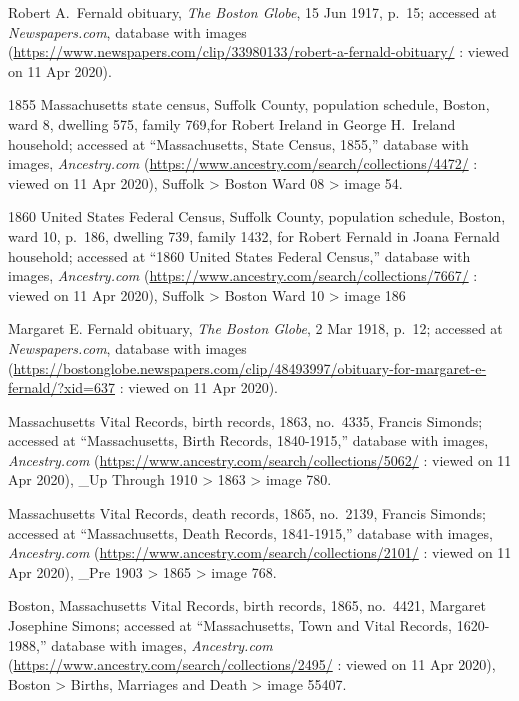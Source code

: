 \begin{thebibliography}{999}
	Robert A.\ Fernald obituary, \textit{The Boston Globe}, 15 Jun 1917, p.\ 15; accessed at \textit{Newspapers.com}, database with images (\url{https://www.newspapers.com/clip/33980133/robert-a-fernald-obituary/} : viewed on 11 Apr 2020).
	
	1855 Massachusetts state census, Suffolk County, population schedule, Boston, ward 8, dwelling 575, family 769,for Robert Ireland in George H.\ Ireland household; accessed at ``Massachusetts, State Census, 1855,'' database with images, \textit{Ancestry.com} (\url{https://www.ancestry.com/search/collections/4472/} : viewed on 11 Apr 2020), Suffolk > Boston Ward 08 > image 54.
	
	1860 United States Federal Census, Suffolk County, population schedule, Boston, ward 10, p.\ 186, dwelling 739, family 1432, for Robert Fernald in Joana Fernald household; accessed at ``1860 United States Federal Census,'' database with images, \textit{Ancestry.com} (\url{https://www.ancestry.com/search/collections/7667/} : viewed on 11 Apr 2020), Suffolk > Boston Ward 10 > image 186
	
	Margaret E. Fernald obituary, \textit{The Boston Globe}, 2 Mar 1918, p.\ 12; accessed at \textit{Newspapers.com}, database with images (\url{https://bostonglobe.newspapers.com/clip/48493997/obituary-for-margaret-e-fernald/?xid=637} : viewed on 11 Apr 2020).
	
	Massachusetts Vital Records, birth records, 1863, no.\ 4335, Francis Simonds; accessed at ``Massachusetts, Birth Records, 1840-1915,'' database with images, \textit{Ancestry.com} (\url{https://www.ancestry.com/search/collections/5062/} : viewed on 11 Apr 2020), \_Up Through 1910 > 1863 > image 780.
	
	Massachusetts Vital Records, death records, 1865, no.\ 2139, Francis Simonds; accessed at ``Massachusetts, Death Records, 1841-1915,'' database with images, \textit{Ancestry.com} (\url{https://www.ancestry.com/search/collections/2101/} : viewed on 11 Apr 2020), \_Pre 1903 > 1865 > image 768.
	
	Boston, Massachusetts Vital Records, birth records, 1865, no.\ 4421, Margaret Josephine Simons; accessed at ``Massachusetts, Town and Vital Records, 1620-1988,'' database with images, \textit{Ancestry.com} (\url{https://www.ancestry.com/search/collections/2495/} : viewed on 11 Apr 2020), Boston > Births, Marriages and Death > image 55407.
	

\end{thebibliography}
